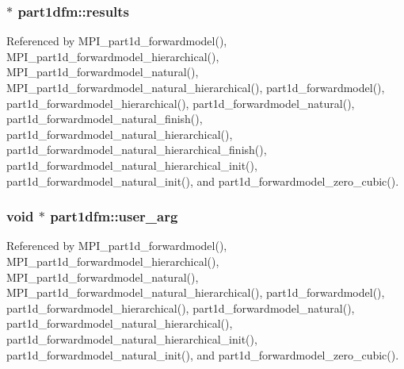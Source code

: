 \subsubsection[{\texorpdfstring{results}{results}}]{ $\ast$ part1dfm\+::results}\hypertarget{structpart1dfm_ad28611315f278836b0b0a7ba25baa551}{}\label{structpart1dfm_ad28611315f278836b0b0a7ba25baa551}


Referenced by M\+P\+I\+\_\+part1d\+\_\+forwardmodel(), M\+P\+I\+\_\+part1d\+\_\+forwardmodel\+\_\+hierarchical(), M\+P\+I\+\_\+part1d\+\_\+forwardmodel\+\_\+natural(), M\+P\+I\+\_\+part1d\+\_\+forwardmodel\+\_\+natural\+\_\+hierarchical(), part1d\+\_\+forwardmodel(), part1d\+\_\+forwardmodel\+\_\+hierarchical(), part1d\+\_\+forwardmodel\+\_\+natural(), part1d\+\_\+forwardmodel\+\_\+natural\+\_\+finish(), part1d\+\_\+forwardmodel\+\_\+natural\+\_\+hierarchical(), part1d\+\_\+forwardmodel\+\_\+natural\+\_\+hierarchical\+\_\+finish(), part1d\+\_\+forwardmodel\+\_\+natural\+\_\+hierarchical\+\_\+init(), part1d\+\_\+forwardmodel\+\_\+natural\+\_\+init(), and part1d\+\_\+forwardmodel\+\_\+zero\+\_\+cubic().

\subsubsection[{\texorpdfstring{user\+\_\+arg}{user_arg}}]{\setlength{\rightskip}{0pt plus 5cm}void $\ast$ part1dfm\+::user\+\_\+arg}\hypertarget{structpart1dfm_ab255e4bf81b324b1c1ace6a88921f05d}{}\label{structpart1dfm_ab255e4bf81b324b1c1ace6a88921f05d}


Referenced by M\+P\+I\+\_\+part1d\+\_\+forwardmodel(), M\+P\+I\+\_\+part1d\+\_\+forwardmodel\+\_\+hierarchical(), M\+P\+I\+\_\+part1d\+\_\+forwardmodel\+\_\+natural(), M\+P\+I\+\_\+part1d\+\_\+forwardmodel\+\_\+natural\+\_\+hierarchical(), part1d\+\_\+forwardmodel(), part1d\+\_\+forwardmodel\+\_\+hierarchical(), part1d\+\_\+forwardmodel\+\_\+natural(), part1d\+\_\+forwardmodel\+\_\+natural\+\_\+hierarchical(), part1d\+\_\+forwardmodel\+\_\+natural\+\_\+hierarchical\+\_\+init(), part1d\+\_\+forwardmodel\+\_\+natural\+\_\+init(), and part1d\+\_\+forwardmodel\+\_\+zero\+\_\+cubic().

